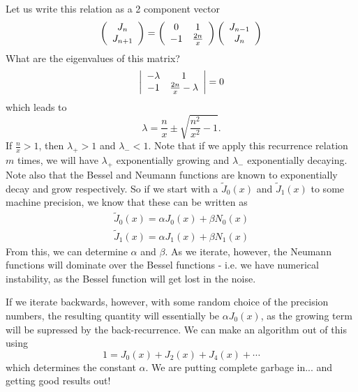 \documentclass{mathnotes}
\begin{document}
Let us write this relation as a 2 component vector
\begin{align*}
    \left(\begin{array}{c}
        J_n\\
        J_{n+1}
    \end{array}\right)
    =
    \left(
    \begin{array}[]{cc}
        0 & 1\\
        -1 & \frac{2n}{x}
    \end{array}
    \right)
    \left( 
    \begin{array}{c}
        J_{n-1}\\
        J_{n}
    \end{array}\right)
\end{align*}
What are the eigenvalues of this matrix?
\begin{align*}
    \left|\begin{array}[]{cc}
        -\lambda & 1\\
        -1 & \frac{2n}{x}-\lambda
    \end{array}\right|=0
\end{align*}
which leads to
\[\lambda=\frac{n}{x}\pm\sqrt{\frac{n^2}{x^2}-1}.\]
If $\frac{n}{x}>1$, then $\lambda_+>1$ and $\lambda_-<1$. Note that if we apply this recurrence relation $m$ times,
we will have $\lambda_+$ exponentially growing and $\lambda_-$ exponentially decaying. Note also that the Bessel and Neumann functions
are known to exponentially decay and grow respectively. So if we start with a $\tilde{J}_0(x)$ and $\tilde{J}_1(x)$ to some machine precision,
we know that these can be written as
\begin{align*}
    \tilde{J}_0(x)= \alpha J_{0}(x)+\beta N_0(x)\\
    \tilde{J}_1(x)= \alpha J_{1}(x)+\beta N_1(x)
\end{align*}
From this, we can determine $\alpha$ and $\beta$. As we iterate, however, the Neumann functions will dominate over the Bessel functions - i.e. we have
numerical instability, as the Bessel function will get lost in the noise.

If we iterate backwards, however, with some random choice of the precision numbers, the resulting quantity will essentially be $\alpha J_0(x)$, as the
growing term will be supressed by the back-recurrence. We can make an algorithm out of this using
\[1=J_0(x)+J_2(x)+J_4(x)+\cdots\]
which determines the constant $\alpha$. We are putting complete garbage in... and getting good results out!
\end{document}

